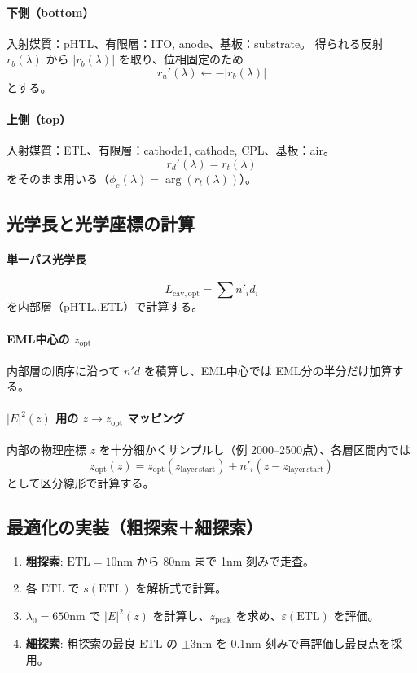 \paragraph{下側（bottom）}
入射媒質：pHTL、有限層：ITO, anode、基板：substrate。
得られる反射 \(r_b(\lambda)\) から \(|r_b(\lambda)|\) を取り、位相固定のため
\[
r_u'(\lambda)\leftarrow -|r_b(\lambda)|
\]
とする。

\paragraph{上側（top）}
入射媒質：ETL、有限層：cathode1, cathode, CPL、基板：air。
\[
r_d'(\lambda)=r_t(\lambda)
\]
をそのまま用いる（\(\phi_e(\lambda)=\arg(r_t(\lambda))\)）。

\subsection{光学長と光学座標の計算}
\paragraph{単一パス光学長}
\[
L_{\mathrm{cav,opt}}=\sum n'_i d_i
\]
を内部層（pHTL..ETL）で計算する。

\paragraph{EML中心の \(z_{\mathrm{opt}}\)}
内部層の順序に沿って \(n'd\) を積算し、EML中心では EML分の半分だけ加算する。

\paragraph{\(|E|^2(z)\) 用の \(z\to z_{\mathrm{opt}}\) マッピング}
内部の物理座標 \(z\) を十分細かくサンプルし（例 2000--2500点）、各層区間内では
\[
z_{\mathrm{opt}}(z)=z_{\mathrm{opt}}(z_{\mathrm{layer\,start}})+n'_i (z-z_{\mathrm{layer\,start}})
\]
として区分線形で計算する。

\subsection{最適化の実装（粗探索＋細探索）}
\begin{enumerate}
\item \textbf{粗探索}: \(\mathrm{ETL}=10\)nm から 80nm まで 1nm 刻みで走査。
\item 各 \(\mathrm{ETL}\) で \(s(\mathrm{ETL})\) を解析式で計算。
\item \(\lambda_0=650\)nm で \(|E|^2(z)\) を計算し、\(z_{\mathrm{peak}}\) を求め、\(\varepsilon(\mathrm{ETL})\) を評価。
\item \textbf{細探索}: 粗探索の最良 \(\mathrm{ETL}\) の \(\pm 3\)nm を 0.1nm 刻みで再評価し最良点を採用。
\end{enumerate}

